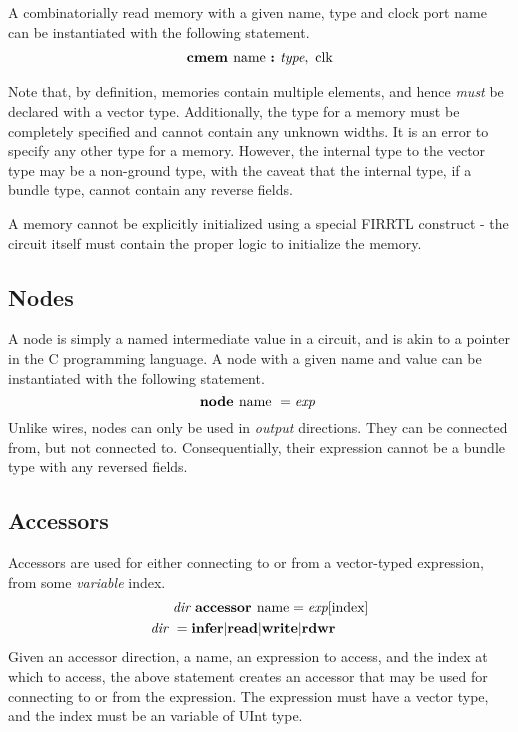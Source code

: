 \documentclass[12pt]{article}
\begin{document}
A combinatorially read memory with a given name, type and clock port name can be instantiated with the following statement.
\[
\begin{aligned}
\text{\bf cmem\ } \text{name } \text{\bf :\ } \text{\em type},\text{ clk} \\
\end{aligned}
\]

Note that, by definition, memories contain multiple elements, and hence {\em must} be declared with a vector type.
Additionally, the type for a memory must be completely specified and cannot contain any unknown widths.
It is an error to specify any other type for a memory.
However, the internal type to the vector type may be a non-ground type, with the caveat that the internal type, if a bundle type, cannot contain any reverse fields.

A memory cannot be explicitly initialized using a special FIRRTL construct - the circuit itself must contain the proper logic to initialize the memory.

\subsection{Nodes}
A node is simply a named intermediate value in a circuit, and is akin to a pointer in the C programming language.
A node with a given name and value can be instantiated with the following statement.
\[
\text{\bf node\ } \text{name } = \text{\em exp\ } \\
\]
Unlike wires, nodes can only be used in {\em output} directions.
They can be connected from, but not connected to.
Consequentially, their expression cannot be a bundle type with any reversed fields.

\subsection{Accessors}
Accessors are used for either connecting to or from a vector-typed expression, from some {\em variable} index.
\[
\begin{aligned}
&\text{\em dir\ } \text{\bf accessor\ } \text{name} = \text{\em exp}[\text{index}] \\
\text{\em dir\ }        &=     \text{\bf infer} \vert \text{\bf read} \vert \text{\bf write} \vert \text{\bf rdwr\ } \\
\end{aligned}
\]
Given an accessor direction, a name, an expression to access, and the index at which to access, the above statement creates an accessor that may be used for connecting to or from the expression.
The expression must have a vector type, and the index must be an variable of UInt type.
\end{document}
